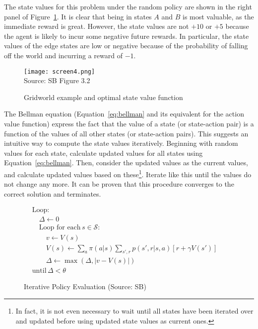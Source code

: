 The state values for this problem under the random policy are shown in the right panel of Figure~\ref{fig:sb32}. It is clear that being in states $A$ and $B$ is most valuable, as the immediate reward is great. However, the state values are not $+10$ or $+5$ because the agent is likely to incur some negative future rewards. In particular, the state values of the edge states are low or negative because of the probability of falling off the world and incurring a reward of $-1$. 

\begin{figure}
\centering
\texttt{[image: screen4.png]} \\

\scriptsize Source: SB Figure 3.2 \normalsize
\caption{Gridworld example and optimal state value function}
\label{fig:sb32}
\end{figure}

The Bellman equation (Equation~\ref{eq:bellman} and its equivalent for the action value function) express the fact that the value of a state (or state-action pair) is a function of the values of all other states (or state-action pairs). This suggests an intuitive way to compute the state values iteratively. Beginning with random values for each state, calculate updated values for all states using Equation~\ref{eq:bellman}. Then, consider the updated values as the current values, and calculate updated values based on these\footnote{In fact, it is not even necessary to wait until all states have been iterated over and updated before using updated state values as current ones.}. Iterate like this until the values do not change any more. It can be proven that this procedure converges to the correct solution and terminates. 


\begin{figure}
\small
\begin{pseudocodebox}
\vspace{-\baselineskip}
\begin{align*}
&\text{Loop:} \\
&\quad \Delta \leftarrow 0 \\
&\quad \text{Loop for each}\, s \in \mathcal{S}: \\
&\quad \quad v \leftarrow V(s) \\
&\quad \quad V(s) \leftarrow \sum\nolimits_a \pi(a|s) \sum\nolimits_{s', r} p(s', r|s, a)[r + \gamma V(s')] \hspace{1in} \\
&\quad \quad \Delta \leftarrow \max (\Delta, |v - V(s)|) \\
&\text{until}\, \Delta < \theta
\end{align*}
\end{pseudocodebox}
\caption{Iterative Policy Evaluation (Source: SB)}
\label{fig:policyiteration}
\end{figure}

